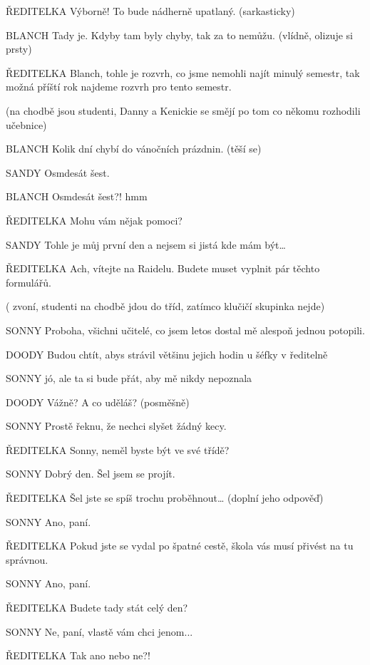 ŘEDITELKA                 Výborně! To bude nádherně upatlaný. (sarkasticky)

BLANCH                Tady je. Kdyby tam byly chyby, tak za to nemůžu. (vlídně, olizuje si prsty)

ŘEDITELKA                Blanch, tohle je rozvrh, co jsme nemohli najít minulý semestr, tak                         možná příští rok najdeme rozvrh pro tento semestr.

(na chodbě jsou studenti, Danny a Kenickie se smějí po tom co někomu rozhodili učebnice)

BLANCH        Kolik dní chybí do vánočních prázdnin. (těší se)

SANDY        Osmdesát šest.

BLANCH        Osmdesát šest?! hmm

ŘEDITELKA        Mohu vám nějak pomoci?

SANDY        Tohle je můj první den a nejsem si jistá kde mám být…

ŘEDITELKA        Ach, vítejte na Raidelu. Budete muset vyplnit pár těchto formulářů.        

( zvoní, studenti na chodbě jdou do tříd, zatímco klučičí skupinka nejde)

SONNY         Proboha, všichni učitelé, co jsem letos dostal mě alespoň jednou potopili.

DOODY        Budou chtít, abys strávil většinu jejich hodin u šéfky v ředitelně

SONNY        jó, ale ta si bude přát, aby mě nikdy nepoznala

DOODY        Vážně? A co uděláš? (posměšně)

SONNY        Prostě řeknu, že nechci slyšet žádný kecy. 

ŘEDITELKA         Sonny, neměl byste být ve své třídě?

SONNY         Dobrý den. Šel jsem se projít.

ŘEDITELKA        Šel jste se spíš trochu proběhnout… (doplní jeho odpověď)

SONNY        Ano, paní.

ŘEDITELKA        Pokud jste se vydal po špatné cestě, škola vás musí přivést na tu                 správnou.

SONNY        Ano, paní.

ŘEDITELKA        Budete tady stát celý den?

SONNY        Ne, paní, vlastě vám chci jenom...

ŘEDITELKA        Tak ano nebo ne?!


